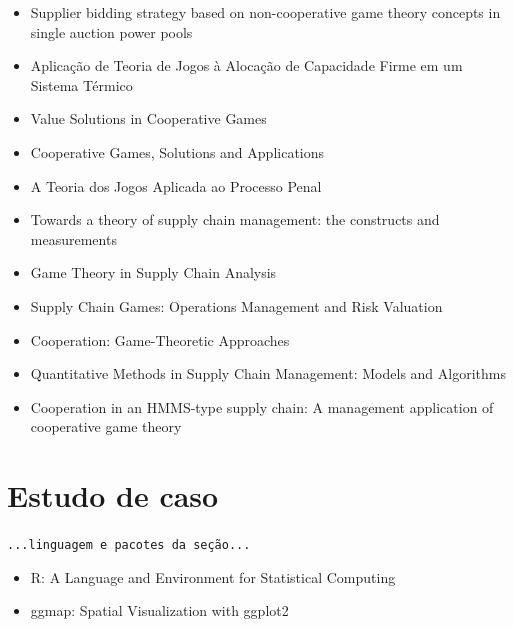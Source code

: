 \documentclass[
	article,			        %
	11pt,				          %
	oneside,			        %
	a4paper,			        %
	english,			        %
	brazil,				        %
	sumario=tradicional
]{abntex2}\usepackage[]{graphicx}\usepackage[]{color}
\begin{document}
  \begin{itemize}
    \item Supplier bidding strategy based on non-cooperative game theory concepts in single auction power pools \cite{Kang.2007}
    \item Aplicação de Teoria de Jogos à Alocação de Capacidade Firme em um Sistema Térmico \cite{Ayala.2008}
    \item Value Solutions in Cooperative Games \cite{Mccain.2013} 
    \item Cooperative Games, Solutions and Applications \cite{Driessen.2013}
    \item A Teoria dos Jogos Aplicada ao Processo Penal \cite{Rosa.2014}
    \item Towards a theory of supply chain management: the constructs and measurements \cite{Chen.2004}
    \item Game Theory in Supply Chain Analysis \cite{Cachon.2004}
    \item Supply Chain Games: Operations Management and Risk Valuation \cite{kogan.2007}
    \item Cooperation: Game-Theoretic Approaches \cite{Hart.2012}
    \item Quantitative Methods in Supply Chain Management: Models and Algorithms \cite{Christou.2012}
    \item Cooperation in an HMMS-type supply chain: A management application of cooperative game theory \cite{Dobos.2010b}
  \end{itemize}

\section{Estudo de caso}

  \texttt{\color{red}...linguagem e pacotes da seção...}
  \begin{itemize}
    \item R: A Language and Environment for Statistical Computing \cite{R.2016}
    \item ggmap: Spatial Visualization with ggplot2 \cite{Kahle.2013}
  \end{itemize}
\end{document}

